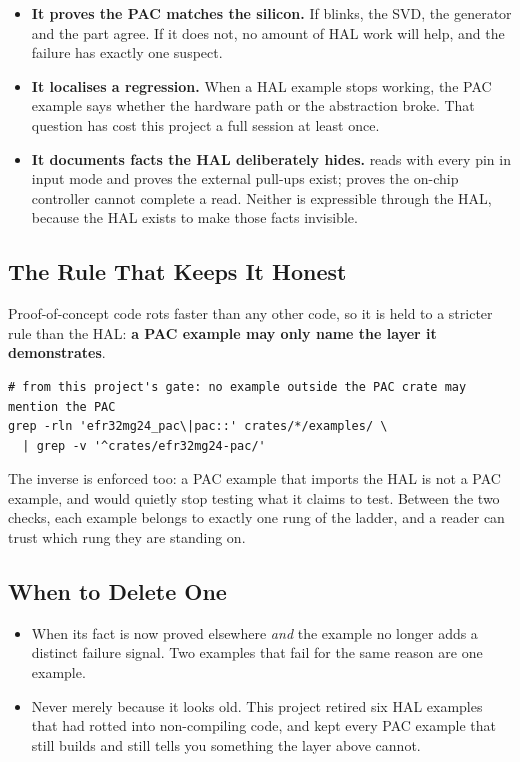 \begin{itemize}
    \item \textbf{It proves the PAC matches the silicon.} If  blinks, the
          SVD, the generator and the part agree. If it does not, no amount of HAL work will help,
          and the failure has exactly one suspect.
    \item \textbf{It localises a regression.} When a HAL example stops working, the PAC example says
          whether the hardware path or the abstraction broke. That question has cost this project a
          full session at least once.
    \item \textbf{It documents facts the HAL deliberately hides.} 
          reads  with every pin in input mode and proves the external pull-ups
          exist;  proves the on-chip controller cannot complete a read.
          Neither is expressible through the HAL, because the HAL exists to make those facts
          invisible.
\end{itemize}

\subsection{The Rule That Keeps It Honest}

Proof-of-concept code rots faster than any other code, so it is held to a stricter rule than the
HAL: \textbf{a PAC example may only name the layer it demonstrates}.

\begin{verbatim}
# from this project's gate: no example outside the PAC crate may mention the PAC
grep -rln 'efr32mg24_pac\|pac::' crates/*/examples/ \
  | grep -v '^crates/efr32mg24-pac/'
\end{verbatim}

The inverse is enforced too: a PAC example that imports the HAL is not a PAC example, and would
quietly stop testing what it claims to test. Between the two checks, each example belongs to exactly
one rung of the ladder, and a reader can trust which rung they are standing on.

\subsection{When to Delete One}

\begin{itemize}
    \item When its fact is now proved elsewhere \emph{and} the example no longer adds a distinct
          failure signal. Two examples that fail for the same reason are one example.
    \item Never merely because it looks old. This project retired six HAL examples that had rotted
          into non-compiling code, and kept every PAC example that still builds and still tells you
          something the layer above cannot.
\end{itemize}
